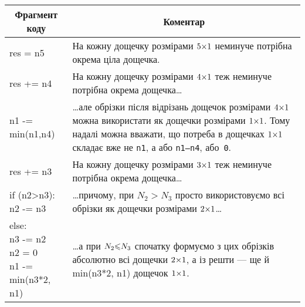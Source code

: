 {

\def\leftColumnWidth{0.35\textwidth}
\def\rightColumnWidth{0.6\textwidth}
\def\leftCell#1{\ttfamily\obeylines\obeyspaces\frenchspacing
\begin{minipage}[t]{\leftColumnWidth}
{\ttfamily\obeylines\obeyspaces\frenchspacing #1}
\end{minipage}}
\def\rightCell#1{
\begin{minipage}[t]{\rightColumnWidth}
{#1}
\end{minipage}\medskip}

\def\tabbb{\hspace*{2em}}

\begin{longtable}{|p{\leftColumnWidth}|p{\rightColumnWidth}|}
\hline
\multicolumn{1}{|c|}{Фрагмент коду} 
&
\multicolumn{1}{|c|}{Коментар}
\\\hline\endhead

\leftCell{res = n5}
&
\rightCell{На кожну дощечку розмірами $5{\times}1$ неминуче потрібна окрема ціла дощечка.}
\\\hline

\leftCell{res += n4}
&
\rightCell{На кожну дощечку розмірами $4{\times}1$ теж неминуче потрібна окрема дощечка\dots}
\\\hline

\leftCell{n1 -= min(n1,n4)}
&
\rightCell{\dots{}але обрізки після відрізань дощечок розмірами $4{\times}1$ можна використати як дощечки розмірами $1{\times}1$. Тому надалі можна вважати, що потреба в дощечках $1{\times}1$ складає вже не \texttt{n1}, а або \texttt{n1–n4}, або~\texttt{0}.}
\\\hline

\leftCell{res += n3}
&
\rightCell{На кожну дощечку розмірами $3{\times}1$ теж неминуче потрібна окрема дощечка\dots}
\\\hline

\leftCell{if (n2>n3):\\
\tabbb{}n2 -= n3}
&
\rightCell{\dots{}причому, при $N_2{>}N_3$ просто використовуємо всі обрізки як дощечки розмірами $2{\times}1$\dots}
\\\hline

\leftCell{else:\\
\tabbb{}n3 -= n2\\
\tabbb{}n2 = 0\\
\tabbb{}n1 -= min(n3*2, n1)}
&
\rightCell{\dots{}а при $N_2{\leqslant}N_3$ спочатку формуємо з цих обрізків абсолютно всі дощечки $2{\times}1$, а із решти — ще й min(n3*2, n1) дощечок $1{\times}1$.}
\\\hline


\end{longtable}}

